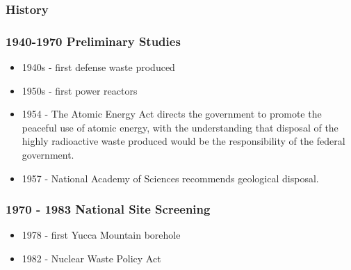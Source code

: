 
\begin{frame}[ctb!]
  \frametitle{History}
  
\end{frame}
\begin{frame}[ctb!]
  \frametitle{1940-1970 Preliminary Studies}
  \begin{itemize}
    \item 1940s - first defense waste produced
    \item 1950s - first power reactors
    \item 1954 - The Atomic Energy Act directs the government to promote the 
      peaceful use of atomic energy, with the understanding that disposal of the 
      highly radioactive waste produced would be the responsibility of the 
      federal government.
    \item 1957 - National Academy of Sciences recommends geological disposal.
  \end{itemize}
\end{frame}

\begin{frame}[ctb!]
  \frametitle{1970 - 1983 National Site Screening}
  \begin{itemize}
    \item 1978 - first Yucca Mountain borehole
    \item 1982 - Nuclear Waste Policy Act
  \end{itemize}
\end{frame}

